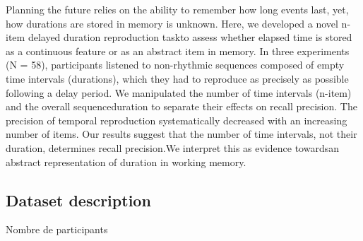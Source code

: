 Planning the future relies on the ability to remember how long events last, yet, how durations  are  stored  in  memory  is  unknown.  Here,  we  developed  a  novel n-item delayed duration reproduction taskto assess whether elapsed time is stored as a continuous feature or as an abstract item in memory. In three experiments (N = 58), participants listened to non-rhythmic sequences composed of empty time intervals (durations), which they had to reproduce as precisely as possible following a delay period.  We  manipulated  the  number  of  time  intervals  (n-item)  and  the  overall sequenceduration  to separate  their effects  on  recall  precision.  The  precision  of temporal reproduction systematically decreased with an increasing number of items. Our results suggest that the number of time intervals, not their duration, determines recall precision.We interpret this as evidence towardsan abstract representation of duration in working memory.


\subsection{Dataset description}


Nombre de participants


